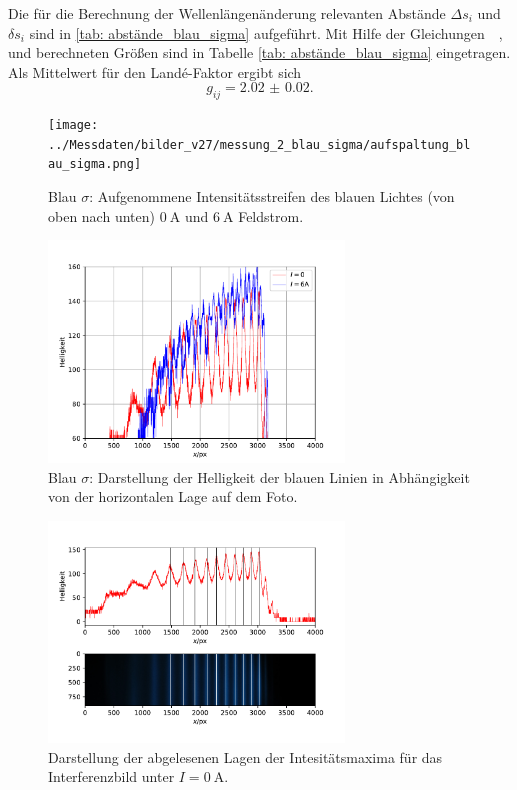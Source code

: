 Die für die Berechnung der Wellenlängenänderung relevanten Abstände $\Delta s_i$ und $\delta s_i$
sind in \autoref{tab: abstände_blau_sigma}
aufgeführt. Mit Hilfe der Gleichungen~~\label{eq: wellen_änderung}, \label{eq:energie_diff} und \label{eq: uebergangs_lande}
berechneten Größen sind in Tabelle
\ref{tab: abstände_blau_sigma} eingetragen. Als Mittelwert für den Landé-Faktor ergibt sich
\begin{equation}
  g_{ij} = \num{2.02(2)}.
\end{equation}
\begin{figure}
  \centering
  \texttt{[image: ../Messdaten/bilder\_v27/messung\_2\_blau\_sigma/aufspaltung\_blau\_sigma.png]}
  \caption{Blau $\sigma$: Aufgenommene Intensitätsstreifen des blauen Lichtes (von oben nach unten) $\SI{0}{\ampere}$ und $\SI{6}{\ampere}$ Feldstrom.}
  \label{fig: aufspaltung_blau_sigma}
\end{figure}
\begin{figure}
  \centering
  \includegraphics[width = 0.7\textwidth]{../Messdaten/plots/blau_sigma_intensitaet.pdf}
  \caption{Blau $\sigma$: Darstellung der Helligkeit der blauen Linien in Abhängigkeit von der horizontalen Lage auf dem Foto.}
  \label{fig: blau_intensität_sigma}
\end{figure}

\begin{figure}
  \centering
  \includegraphics[width = 0.7\textwidth]{../Messdaten/plots/peaks_blau_sigma_0.pdf}
  \caption{Darstellung der abgelesenen Lagen der Intesitätsmaxima für das Interferenzbild unter $I =\SI{0}{\ampere}$.}
  \label{fig: peaks_blau_0}
\end{figure}
